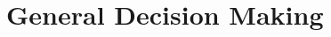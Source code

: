 \documentclass[../main]{subfiles}
\begin{document}
\setcounter{chapter}{5}

\chapter{General Decision Making}




\end{document}
